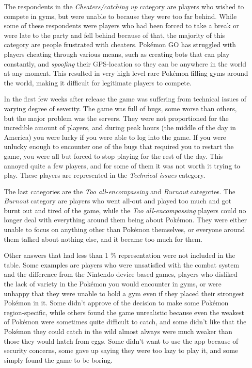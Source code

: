 The respondents in the \emph{Cheaters/catching up} category are players who wished to compete in gyms, but were unable to because they were too far behind. While some of these respondents were players who had been forced to take a break or were late to the party and fell behind because of that, the majority of this category are people frustrated with cheaters. Pokémon GO has struggled with players cheating through various means, such as creating bots that can play constantly, and \emph{spoofing} their GPS-location so they can be anywhere in the world at any moment. This resulted in very high level rare Pokémon filling gyms around the world, making it difficult for legitimate players to compete.

In the first few weeks after release the game was suffering from technical issues of varying degree of severity. The game was full of bugs, some worse than others, but the major problem was the servers. They were not proportioned for the incredible amount of players, and during peak hours (the middle of the day in America) you were lucky if you were able to log into the game. If you were unlucky enough to encounter one of the bugs that required you to restart the game, you were all but forced to stop playing for the rest of the day. This annoyed quite a few players, and for some of them it was not worth it trying to play. These players are represented in the \emph{Technical issues} category.

The last categories are the \emph{Too all-encompassing} and \emph{Burnout} categories. The \emph{Burnout} category are players who went all-out and played too much and got burnt out and tired of the game, while the \emph{Too all-encompassing} players could no longer deal with everything around them being about Pokémon. They were either unable to focus on anything other than Pokémon themselves, or everyone around them talked about nothing else, and it became too much for them.

Other answers that had less than 1 \% representation were not included in the table. Some examples are players who were unsatisfied with the combat system and the difference from the Nintendo device based games, players who disliked the lack of variety in the Pokémon you would encounter in gyms, or were unhappy that they were unable to hold a gym even if they placed their strongest Pokémon in it. Some didn't approve of the decision to make some Pokémon region-specific, while others found the game unrealistic because even the weakest of Pokémon were sometimes quite difficult to catch, and some didn't like that the Pokémon they could catch in the wild almost always were much weaker than those they would hatch from eggs. Some didn't want to use the app because of security concerns, some gave up saying they were too lazy to play it, and some simply found the game to be boring.

